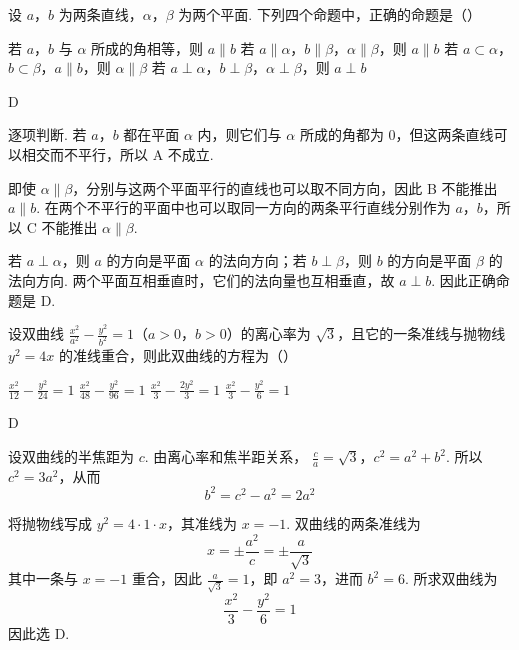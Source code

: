 \begin{problem}
设 \(a\)，\(b\) 为两条直线，\(\alpha\)，\(\beta\) 为两个平面. 下列四个命题中，正确的命题是（\quad）

\choices
    {若 \(a\)，\(b\) 与 \(\alpha\) 所成的角相等，则 \(a \parallel b\)}
    {若 \(a \parallel \alpha\)，\(b \parallel \beta\)，\(\alpha \parallel \beta\)，则 \(a \parallel b\)}
    {若 \(a \subset \alpha\)，\(b \subset \beta\)，\(a \parallel b\)，则 \(\alpha \parallel \beta\)}
    {若 \(a \perp \alpha\)，\(b \perp \beta\)，\(\alpha \perp \beta\)，则 \(a \perp b\)}
\end{problem}

\begin{answer}
D
\end{answer}

\begin{solution}
逐项判断. 若 \(a\)，\(b\) 都在平面 \(\alpha\) 内，则它们与 \(\alpha\) 所成的角都为 \(0\)，但这两条直线可以相交而不平行，所以 A 不成立.

即使 \(\alpha\parallel\beta\)，分别与这两个平面平行的直线也可以取不同方向，因此 B 不能推出 \(a\parallel b\). 在两个不平行的平面中也可以取同一方向的两条平行直线分别作为 \(a\)，\(b\)，所以 C 不能推出 \(\alpha\parallel\beta\).

若 \(a\perp\alpha\)，则 \(a\) 的方向是平面 \(\alpha\) 的法向方向；若 \(b\perp\beta\)，则 \(b\) 的方向是平面 \(\beta\) 的法向方向. 两个平面互相垂直时，它们的法向量也互相垂直，故 \(a\perp b\). 因此正确命题是 D.
\end{solution}

\begin{problem}
设双曲线 \(\frac{x^2}{a^2} - \frac{y^2}{b^2} = 1\)（\(a > 0\)，\(b > 0\)）的离心率为 \(\sqrt{3}\)，且它的一条准线与抛物线 \(y^2 = 4x\) 的准线重合，则此双曲线的方程为（\quad）

\choices
    {\(\frac{x^2}{12} - \frac{y^2}{24} = 1\)}
    {\(\frac{x^2}{48} - \frac{y^2}{96} = 1\)}
    {\(\frac{x^2}{3} - \frac{2y^2}{3} = 1\)}
    {\(\frac{x^2}{3} - \frac{y^2}{6} = 1\)}
\end{problem}

\begin{answer}
D
\end{answer}

\begin{solution}
设双曲线的半焦距为 \(c\). 由离心率和焦半距关系，
\(\frac ca=\sqrt3\)，\(c^2=a^2+b^2\).
所以 \(c^2=3a^2\)，从而
\[
b^2=c^2-a^2=2a^2
\]

将抛物线写成 \(y^2=4\cdot1\cdot x\)，其准线为 \(x=-1\). 双曲线的两条准线为
\[
x=\pm\frac{a^2}{c}=\pm\frac a{\sqrt3}
\]
其中一条与 \(x=-1\) 重合，因此 \(\frac{a}{\sqrt3}=1\)，即 \(a^2=3\)，进而 \(b^2=6\). 所求双曲线为
\[
\frac{x^2}{3}-\frac{y^2}{6}=1
\]
因此选 D.
\end{solution}

